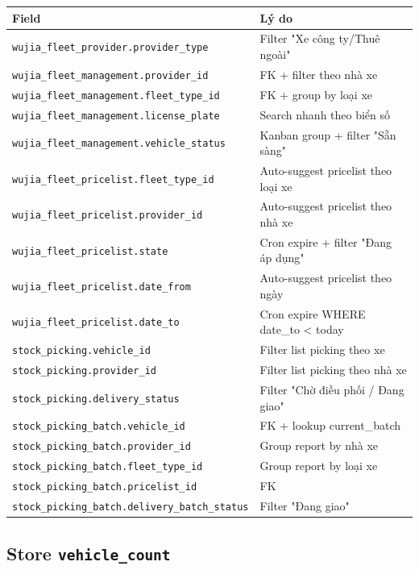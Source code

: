 \begin{longtable}{p{6cm} p{8cm}}
\toprule
\textbf{Field} & \textbf{Lý do} \\
\midrule
\endhead
\texttt{wujia\_fleet\_provider.provider\_type} & Filter "Xe công ty/Thuê ngoài" \\
\texttt{wujia\_fleet\_management.provider\_id} & FK + filter theo nhà xe \\
\texttt{wujia\_fleet\_management.fleet\_type\_id} & FK + group by loại xe \\
\texttt{wujia\_fleet\_management.license\_plate} & Search nhanh theo biển số \\
\texttt{wujia\_fleet\_management.vehicle\_status} & Kanban group + filter "Sẵn sàng" \\
\texttt{wujia\_fleet\_pricelist.fleet\_type\_id} & Auto-suggest pricelist theo loại xe \\
\texttt{wujia\_fleet\_pricelist.provider\_id} & Auto-suggest pricelist theo nhà xe \\
\texttt{wujia\_fleet\_pricelist.state} & Cron expire + filter "Đang áp dụng" \\
\texttt{wujia\_fleet\_pricelist.date\_from} & Auto-suggest pricelist theo ngày \\
\texttt{wujia\_fleet\_pricelist.date\_to} & Cron expire WHERE date\_to < today \\
\texttt{stock\_picking.vehicle\_id} & Filter list picking theo xe \\
\texttt{stock\_picking.provider\_id} & Filter list picking theo nhà xe \\
\texttt{stock\_picking.delivery\_status} & Filter "Chờ điều phối / Đang giao" \\
\texttt{stock\_picking\_batch.vehicle\_id} & FK + lookup current\_batch \\
\texttt{stock\_picking\_batch.provider\_id} & Group report by nhà xe \\
\texttt{stock\_picking\_batch.fleet\_type\_id} & Group report by loại xe \\
\texttt{stock\_picking\_batch.pricelist\_id} & FK \\
\texttt{stock\_picking\_batch.delivery\_batch\_status} & Filter "Đang giao" \\
\bottomrule
\end{longtable}

\subsection{Store \texttt{vehicle\_count}}

